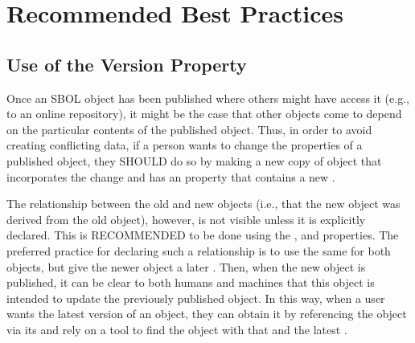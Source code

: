 \section{Recommended Best Practices}
\label{sec:bestpractices}

\subsection{Use of the Version Property}

Once an SBOL object has been published where others might have access it (e.g., to an online repository), it might be the case that other objects come to depend on the particular contents of the published object. 
Thus, in order to avoid creating conflicting data, if a person wants to change the properties of a published object, they SHOULD do so by making a new copy of object that incorporates the change and has an  property that contains a new .

The relationship between the old and new objects (i.e., that the new object was derived from the old object), however, is not visible unless it is explicitly declared.  This is RECOMMENDED to be done using the , and  properties. The preferred practice for declaring such a relationship is to use the same  for both objects, but give the newer object a later . Then, when the new object is published, it can be clear to both humans and machines that this object is intended to update the previously published object. In this way, when a user wants the latest version of an object, they can obtain it by referencing the object via its  and rely on a tool to find the object with that  and the latest .

